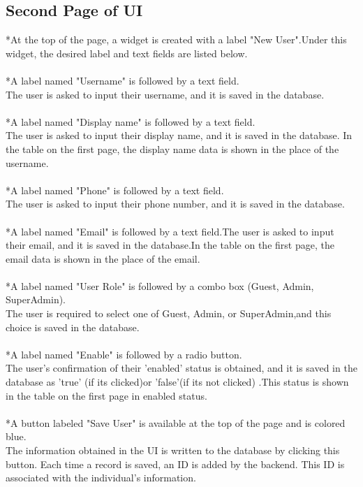 \documentclass{article}
\begin{document}
\subsection{Second Page of UI}
*At the top of the page, a widget is created with a label "New User".Under this widget, the desired label and text fields are listed below.\\
\\
*A label named "Username" is followed by a text field.\\The user is asked to input their username, and it is saved in the database.\\
\\
*A label named "Display name" is followed by a text field.\\The user is asked to input their display name, and it is saved in the database. In the table on the first page, the display name data is shown in the place of the username.\\
\\
*A label named "Phone" is followed by a text field.\\The user is asked to input their phone number, and it is saved in the database.\\
\\
*A label named "Email" is followed by a text field.The user is asked to input their email, and it is saved in the database.In the table on the first page, the email data is shown in the place of the email.\\
\\
*A label named "User Role" is followed by a combo box (Guest, Admin, SuperAdmin).\\The user is required to select one of Guest, Admin, or SuperAdmin,and this choice is saved in the database.\\
\\
*A label named "Enable" is followed by a radio button.\\The user's confirmation of their 'enabled' status is obtained, and it is saved in the database as 'true' (if its clicked)or 'false'(if its not clicked) .This status is shown in the table on the first page in enabled status.\\
\\
*A button labeled "Save User" is available at the top of the page and is colored blue.\\The information obtained in the UI is written to the database by clicking this button. Each time a record is saved, an ID is added by the backend. This ID is associated with the individual's information.
\end{document}

